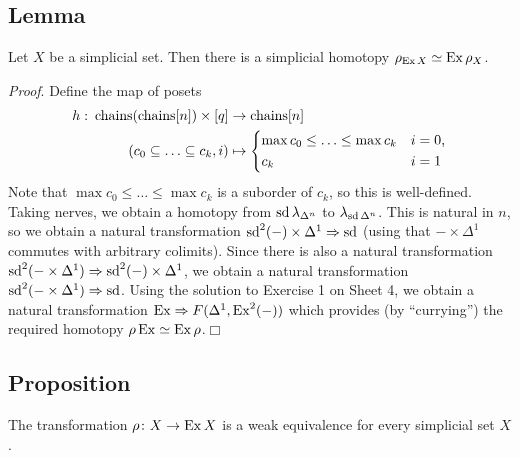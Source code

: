     \subsection{Lemma}\label{chV-4-22}
        Let $X$ be a simplicial set. Then there is a simplicial homotopy $\rho_{\operatorname{Ex} X} \simeq \operatorname{Ex} \rho_X$.
        \smallskip

        \emph{Proof}. Define the map of posets
        \begin{align*}
            h \,\colon \chains(\chains[n]) \times [q] &\to \chains[n] \\
            (c_0 \subseteq \ldots \subseteq c_k, i) &\mapsto
                \begin{cases*}
                    \max c_0 \leq \ldots \leq \max c_k & $i = 0$,\\
                    c_k & $i = 1$
                \end{cases*}
        \end{align*}
        Note that $\max c_0 \leq \ldots \leq \max c_k$ is a suborder of $c_k$, so this is well-defined. Taking nerves, we obtain a homotopy from $\operatorname{sd} \lambda_{\Delta^n}$ to $\lambda_{\operatorname{sd} \Delta^n}$. This is natural in $n$, so we obtain a natural transformation $\operatorname{sd}^2(-) \times \Delta^1 \Rightarrow \operatorname{sd}$ (using that $ - \times \Delta^1$ commutes with arbitrary colimits). Since there is also a natural transformation $\operatorname{sd}^2(- \times \Delta^1) \Rightarrow \operatorname{sd}^2(-) \times \Delta^1$, we obtain a natural transformation $\operatorname{sd}^2(- \times \Delta^1) \Rightarrow \operatorname{sd}$. Using the solution to Exercise 1 on Sheet 4, we obtain a natural transformation $\operatorname{Ex} \Rightarrow F(\Delta^1, \operatorname{Ex}^2(-))$ which provides (by ``currying'') the required homotopy $\rho \operatorname{Ex} \simeq \operatorname{Ex} \rho$.\hfill$\Box$

    \subsection{Proposition}\label{chV-4-23}
        The transformation $\rho \colon X \to \operatorname{Ex} X$ is a weak equivalence for every simplicial set $X$.
        \smallskip

